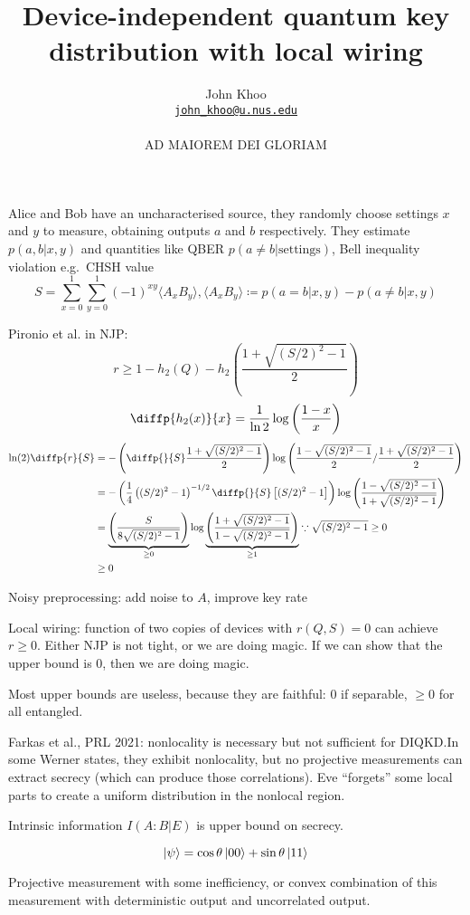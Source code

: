 \documentclass[10pt, a4paper]{article}
\title{Device-independent quantum key distribution with local wiring}
\author{John Khoo\\ \href{mailto:john_khoo@u.nus.edu}{\texttt{john\_khoo@u.nus.edu}} \\\\ AD MAIOREM DEI GLORIAM}
\newcommand{\?}{\mathrel{?}} %
\numberwithin{equation}{section} %
\theoremstyle{definition}
\theoremstyle{plain}
\theoremstyle{plain}
\begin{document}
  Alice and Bob have an uncharacterised source, they randomly choose settings \(x\) and \(y\) to measure, obtaining outputs \(a\) and \(b\) respectively. They estimate \(p(a,b|x,y)\) and quantities like QBER \(p(a \neq b|\text{settings})\), Bell inequality violation e.g.\ CHSH value
  \[ S = \sum_{x=0}^1 \sum_{y=0}^1 {(-1)}^{xy} \langle A_x B_y \rangle, \langle A_x B_y \rangle \coloneqq p(a=b|x,y) - p(a\neq b|x,y) \]

  Pironio et al. in NJP:
  \[ r \geq 1 - h_2(Q) - h_2\left( \frac{1 + \sqrt{(S/2)^2-1}}{2} \right) \]
  \[ \diffp{{h_2(x)}}{x} = \frac{1}{\ln 2} \log \left(\frac{1-x}{x}\right) \]
  \begin{align*}
    \ln (2) \diffp{r}{S} &= - \left( \diffp{}{S} \frac{1 + \sqrt{(S/2)^2-1}}{2} \right) \log \left( \frac{1 - \sqrt{(S/2)^2-1}}{2} / \frac{1 + \sqrt{(S/2)^2-1}}{2} \right) \\
                 &= - \left( \frac{1}{4} \left( (S/2)^2-1 \right)^{-1/2} \diffp{}{S} \left[ (S/2)^2-1 \right] \right) \log \left( \frac{1 - \sqrt{(S/2)^2-1}}{1 + \sqrt{(S/2)^2-1}} \right) \\
                 &= \underbrace{\left( \frac{S}{ 8\sqrt{(S/2)^2-1} } \right)}_{\geq 0} \log \underbrace{ \left( \frac{1 + \sqrt{(S/2)^2-1}}{1 - \sqrt{(S/2)^2-1}} \right) }_{\geq 1} \because \sqrt{(S/2)^2-1} \geq 0 \\
                 &\geq 0
  \end{align*}

  Noisy preprocessing: add noise to \(A\), improve key rate

  Local wiring: function of two copies of devices with \(r(Q, S) = 0\) can achieve \(r \geq 0\). Either NJP is not tight, or we are doing magic. If we can show that the upper bound is 0, then we are doing magic.

  Most upper bounds are useless, because they are faithful: 0 if separable, \(\geq 0\) for all entangled.

  Farkas et al., PRL 2021: nonlocality is necessary but not sufficient for DIQKD.\@ In some Werner states, they exhibit nonlocality, but no projective measurements can extract secrecy (which can produce those correlations). Eve ``forgets'' some local parts to create a uniform distribution in the nonlocal region.

  Intrinsic information \(I(A:B|E)\) is upper bound on secrecy.

  \[ \ket{\psi} = \cos \theta \ket{00} + \sin \theta \ket{11} \]

  Projective measurement with some inefficiency, or convex combination of this measurement with deterministic output and uncorrelated output.
\end{document}

